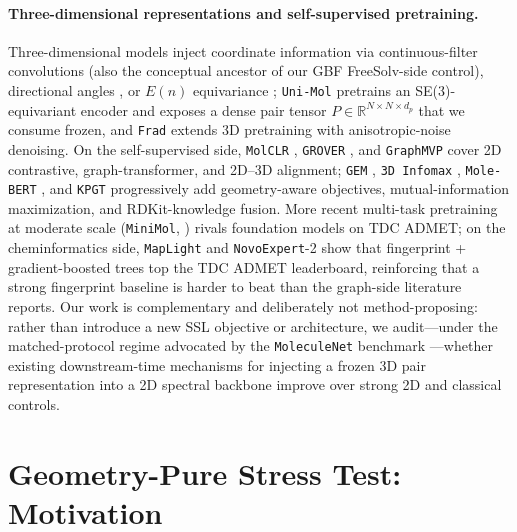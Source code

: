 \documentclass[sigconf,nonacm,anonymous,review]{acmart}
\begin{document}
\paragraph{Three-dimensional representations and self-supervised pretraining.}
Three-dimensional models inject coordinate information via continuous-filter convolutions \citep{schutt2017schnet} (also the conceptual ancestor of our GBF FreeSolv-side control), directional angles \citep{klicpera2020dimenet}, or $E(n)$ equivariance \citep{satorras2021egnn}; \texttt{Uni-Mol} \citep{zhou2023unimol} pretrains an SE(3)-equivariant encoder and exposes a dense pair tensor $P \in \mathbb{R}^{N\times N\times d_p}$ that we consume frozen, and \texttt{Frad} \citep{feng2024frad} extends 3D pretraining with anisotropic-noise denoising. On the self-supervised side, \texttt{MolCLR} \citep{wang2022molclr}, \texttt{GROVER} \citep{rong2020grover}, and \texttt{GraphMVP} \citep{liu2022graphmvp} cover 2D contrastive, graph-transformer, and 2D--3D alignment; \texttt{GEM} \citep{fang2022gem}, \texttt{3D Infomax} \citep{stark2022infomax}, \texttt{Mole-BERT} \citep{xia2023molebert}, and \texttt{KPGT} \citep{li2023kpgt} progressively add geometry-aware objectives, mutual-information maximization, and RDKit-knowledge fusion. More recent multi-task pretraining at moderate scale (\texttt{MiniMol}, \citealp{klaeser2024minimol}) rivals foundation models on TDC ADMET; on the cheminformatics side, \texttt{MapLight} \citep{notwell2023maplight} and \texttt{NovoExpert}-2 \citep{novoexpert2026} show that fingerprint + gradient-boosted trees top the TDC ADMET leaderboard, reinforcing that a strong fingerprint baseline is harder to beat than the graph-side literature reports. Our work is complementary and deliberately not method-proposing: rather than introduce a new SSL objective or architecture, we audit---under the matched-protocol regime advocated by the \texttt{MoleculeNet} benchmark \citep{wu2018moleculenet}---whether existing downstream-time mechanisms for injecting a frozen 3D pair representation into a 2D spectral backbone improve over strong 2D and classical controls.

\section{Geometry-Pure Stress Test: Motivation}
\end{document}
